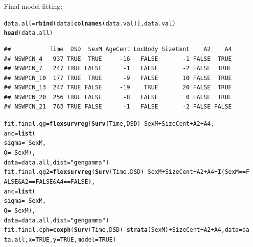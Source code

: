 \documentclass{article}\usepackage[]{graphicx}\usepackage[]{color}
\makeatletter
\newcommand{\hlnum}[1]{\textcolor[rgb]{0.686,0.059,0.569}{#1}}%
\newcommand{\hlstr}[1]{\textcolor[rgb]{0.192,0.494,0.8}{#1}}%
\newcommand{\hlopt}[1]{\textcolor[rgb]{0,0,0}{#1}}%
\newcommand{\hlstd}[1]{\textcolor[rgb]{0.345,0.345,0.345}{#1}}%
\newcommand{\hlkwb}[1]{\textcolor[rgb]{0.69,0.353,0.396}{#1}}%
\newcommand{\hlkwc}[1]{\textcolor[rgb]{0.333,0.667,0.333}{#1}}%
\newcommand{\hlkwd}[1]{\textcolor[rgb]{0.737,0.353,0.396}{\textbf{#1}}}%
\newenvironment{kframe}{%
 \def\at@end@of@kframe{}%
 \ifinner\ifhmode%
  \def\at@end@of@kframe{\end{minipage}}%
  \begin{minipage}{\columnwidth}%
 \fi\fi%
 \def\FrameCommand##1{\hskip\@totalleftmargin \hskip-\fboxsep
 \colorbox{shadecolor}{##1}\hskip-\fboxsep
     \hskip-\linewidth \hskip-\@totalleftmargin \hskip\columnwidth}%
 \MakeFramed {\advance\hsize-\width
   \@totalleftmargin\z@ \linewidth\hsize
   \@setminipage}}%
 {\par\unskip\endMakeFramed%
 \at@end@of@kframe}
\newenvironment{knitrout}{}{} %
\makeatother
\begin{document}
Final model fitting:
\begin{knitrout}
\color{fgcolor}\begin{kframe}
\begin{alltt}
\hlstd{data.all} \hlkwb{=} \hlkwd{rbind}\hlstd{(data[}\hlkwd{colnames}\hlstd{(data.val)], data.val)}
\hlkwd{head}\hlstd{(data.all)}
\end{alltt}
\begin{verbatim}
##           Time  DSD  SexM AgeCent LocBody SizeCent    A2    A4
## NSWPCN_4   937 TRUE  TRUE     -16   FALSE       -1 FALSE  TRUE
## NSWPCN_7   247 TRUE FALSE      -1   FALSE       -2 FALSE  TRUE
## NSWPCN_10  177 TRUE  TRUE      -9   FALSE       10 FALSE  TRUE
## NSWPCN_13  247 TRUE FALSE     -19    TRUE       20 FALSE  TRUE
## NSWPCN_20  256 TRUE FALSE      -8   FALSE        0 FALSE  TRUE
## NSWPCN_21  763 TRUE FALSE      -1   FALSE       -2 FALSE FALSE
\end{verbatim}
\begin{alltt}
\hlstd{fit.final.gg} \hlkwb{=} \hlkwd{flexsurvreg}\hlstd{(}\hlkwd{Surv}\hlstd{(Time, DSD)} \hlopt{~} \hlstd{SexM} \hlopt{+} \hlstd{SizeCent} \hlopt{+} \hlstd{A2} \hlopt{+} \hlstd{A4,}
        \hlkwc{anc} \hlstd{=} \hlkwd{list}\hlstd{(}
                \hlkwc{sigma} \hlstd{=} \hlopt{~} \hlstd{SexM,}
                \hlkwc{Q} \hlstd{=} \hlopt{~} \hlstd{SexM),}
        \hlkwc{data} \hlstd{= data.all,} \hlkwc{dist} \hlstd{=} \hlstr{"gengamma"}\hlstd{)}
\hlstd{fit.final.gg2} \hlkwb{=} \hlkwd{flexsurvreg}\hlstd{(}\hlkwd{Surv}\hlstd{(Time, DSD)} \hlopt{~} \hlstd{SexM} \hlopt{+} \hlstd{SizeCent} \hlopt{+} \hlstd{A2} \hlopt{+} \hlstd{A4} \hlopt{+} \hlkwd{I}\hlstd{(SexM} \hlopt{==} \hlnum{FALSE} \hlopt{&} \hlstd{A2} \hlopt{==} \hlnum{FALSE} \hlopt{&} \hlstd{A4} \hlopt{==} \hlnum{FALSE}\hlstd{),}
    \hlkwc{anc} \hlstd{=} \hlkwd{list}\hlstd{(}
        \hlkwc{sigma} \hlstd{=} \hlopt{~} \hlstd{SexM,}
        \hlkwc{Q} \hlstd{=} \hlopt{~} \hlstd{SexM),}
    \hlkwc{data} \hlstd{= data.all,} \hlkwc{dist} \hlstd{=} \hlstr{"gengamma"}\hlstd{)}
\hlstd{fit.final.cph} \hlkwb{=} \hlkwd{coxph}\hlstd{(}\hlkwd{Surv}\hlstd{(Time, DSD)} \hlopt{~} \hlkwd{strata}\hlstd{(SexM)} \hlopt{+} \hlstd{SizeCent} \hlopt{+} \hlstd{A2} \hlopt{+} \hlstd{A4,} \hlkwc{data} \hlstd{= data.all,} \hlkwc{x} \hlstd{=} \hlnum{TRUE}\hlstd{,} \hlkwc{y} \hlstd{=} \hlnum{TRUE}\hlstd{,} \hlkwc{model} \hlstd{=} \hlnum{TRUE}\hlstd{)}

\end{alltt}
\end{kframe}
\end{knitrout}
\end{document}
